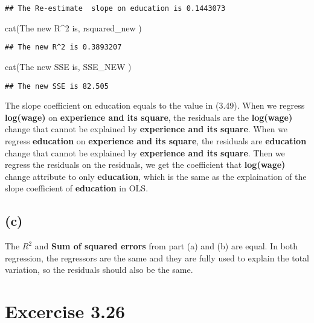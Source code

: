 \documentclass[
]{article}
\newenvironment{Shaded}{\begin{snugshade}}{\end{snugshade}}
\newcommand{\FunctionTok}[1]{\textcolor[rgb]{0.00,0.00,0.00}{#1}}
\newcommand{\NormalTok}[1]{#1}
\newcommand{\StringTok}[1]{\textcolor[rgb]{0.31,0.60,0.02}{#1}}
\begin{document}
\begin{verbatim}
## The Re-estimate  slope on education is 0.1443073
\end{verbatim}

\begin{Shaded}
\begin{Highlighting}[]
\FunctionTok{cat}\NormalTok{(}\StringTok{\textquotesingle{}The new R\^{}2 is\textquotesingle{}}\NormalTok{, rsquared\_new )}
\end{Highlighting}
\end{Shaded}

\begin{verbatim}
## The new R^2 is 0.3893207
\end{verbatim}

\begin{Shaded}
\begin{Highlighting}[]
\FunctionTok{cat}\NormalTok{(}\StringTok{\textquotesingle{}The new SSE is\textquotesingle{}}\NormalTok{, SSE\_NEW )}
\end{Highlighting}
\end{Shaded}

\begin{verbatim}
## The new SSE is 82.505
\end{verbatim}

The slope coefficient on education equals to the value in (3.49). When
we regress \textbf{log(wage)} on \textbf{experience and its square}, the
residuals are the \textbf{log(wage)} change that cannot be explained by
\textbf{experience and its square}. When we regress \textbf{education}
on \textbf{experience and its square}, the residuals are
\textbf{education} change that cannot be explained by \textbf{experience
and its square}. Then we regress the residuals on the residuals, we get
the coefficient that \textbf{log(wage)} change attribute to only
\textbf{education}, which is the same as the explaination of the slope
coefficient of \textbf{education} in OLS.

\hypertarget{c}{%
\subsection{(c)}\label{c}}

The \(R^2\) and \textbf{Sum of squared errors} from part (a) and (b) are
equal. In both regression, the regressors are the same and they are
fully used to explain the total variation, so the residuals should also
be the same.

\hypertarget{excercise-3.26}{%
\section{Excercise 3.26}\label{excercise-3.26}}
\end{document}
